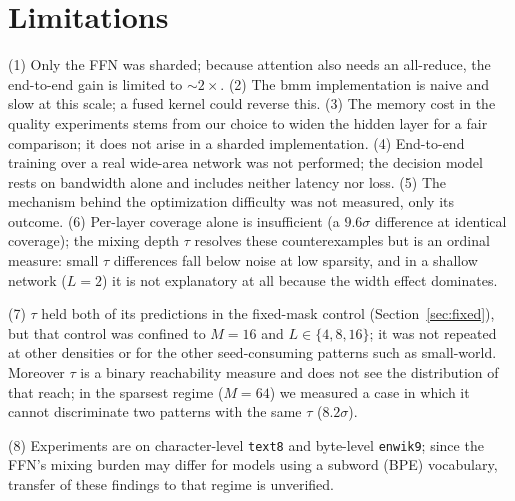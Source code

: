 \documentclass[10pt,journal]{IEEEtran}
\begin{document}
\section{Limitations}
\label{sec:limits}
(1) Only the FFN was sharded; because attention also needs an all-reduce, the end-to-end gain is
limited to $\sim\!2\times$. (2) The bmm implementation is naive and slow at this scale; a fused
kernel could reverse this. (3) The memory cost in the quality experiments stems from our choice
to widen the hidden layer for a fair comparison; it does not arise in a sharded implementation.
(4) End-to-end training over a real wide-area network was not performed; the decision model
rests on bandwidth alone and includes neither latency nor loss. (5) The mechanism behind
the optimization difficulty was not measured, only its outcome. (6) Per-layer coverage alone is
insufficient (a $9.6\sigma$ difference at identical coverage); the mixing depth $\tau$ resolves
these counterexamples but is an ordinal measure: small $\tau$ differences fall below noise at
low sparsity, and in a shallow network ($L{=}2$) it is not explanatory at all because the width
effect dominates.

(7) $\tau$ held both of its predictions in the fixed-mask control (Section~\ref{sec:fixed}), but
that control was confined to $M{=}16$ and $L\in\{4,8,16\}$; it was not repeated at other
densities or for the other seed-consuming patterns such as small-world. Moreover $\tau$ is a
binary reachability measure and does not see the distribution of that reach; in the sparsest
regime ($M{=}64$) we measured a case in which it cannot discriminate two patterns with the same
$\tau$ ($8.2\sigma$).

(8) Experiments are on character-level \texttt{text8} and byte-level \texttt{enwik9}; since the
FFN's mixing burden may differ for models using a subword (BPE) vocabulary, transfer of these
findings to that regime is unverified.

\end{document}
